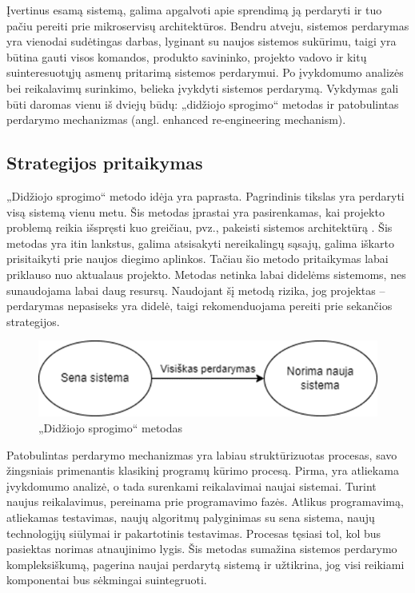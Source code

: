\documentclass[fleqn]{VUMIFPSkursinis}
\begin{document}
Įvertinus esamą sistemą, galima apgalvoti apie sprendimą ją perdaryti ir tuo pačiu pereiti prie mikroservisų architektūros. Bendru atveju, sistemos perdarymas yra vienodai sudėtingas darbas, lyginant su naujos sistemos sukūrimu, taigi yra būtina gauti visos komandos, produkto savininko, projekto vadovo ir kitų suinteresuotųjų asmenų pritarimą sistemos perdarymui. Po įvykdomumo analizės bei reikalavimų surinkimo, belieka įvykdyti sistemos perdarymą. Vykdymas gali būti daromas vienu iš dviejų būdų: „didžiojo sprogimo“ \cite{Ngu11} metodas ir patobulintas perdarymo mechanizmas \cite{MQO18} (angl. enhanced re-engineering mechanism).

\subsection{Strategijos pritaikymas}
„Didžiojo sprogimo“ metodo idėja yra paprasta. Pagrindinis tikslas yra perdaryti visą sistemą vienu metu. Šis metodas įprastai yra pasirenkamas, kai projekto problemą reikia išspręsti kuo greičiau, pvz., pakeisti sistemos architektūrą \cite{Ngu11}. Šis metodas yra itin lankstus, galima atsisakyti nereikalingų sąsajų, galima iškarto prisitaikyti prie naujos diegimo aplinkos. Tačiau šio metodo pritaikymas labai priklauso nuo aktualaus projekto. Metodas netinka labai didelėms sistemoms, nes sunaudojama labai daug resursų. Naudojant šį metodą rizika, jog projektas – perdarymas nepasiseks yra didelė, taigi rekomenduojama pereiti prie sekančios strategijos.
\begin{figure}[H]
    \centering
    \includegraphics{img/didziojo-sprogimo-metodas.png}
    \caption{„Didžiojo sprogimo“ metodas}
    \label{img:didziojo-sprogimo-metodas}
\end{figure}

Patobulintas perdarymo mechanizmas yra labiau struktūrizuotas procesas, savo žingsniais primenantis klasikinį programų kūrimo procesą. Pirma, yra atliekama įvykdomumo analizė, o tada surenkami reikalavimai naujai sistemai. Turint naujus reikalavimus, pereinama prie programavimo fazės. Atlikus programavimą, atliekamas testavimas, naujų algoritmų palyginimas su sena sistema, naujų technologijų siūlymai ir pakartotinis testavimas. Procesas tęsiasi tol, kol bus pasiektas norimas atnaujinimo lygis. Šis metodas sumažina sistemos perdarymo kompleksiškumą, pagerina naujai perdarytą sistemą ir užtikrina, jog visi reikiami komponentai bus sėkmingai suintegruoti.
\end{document}
